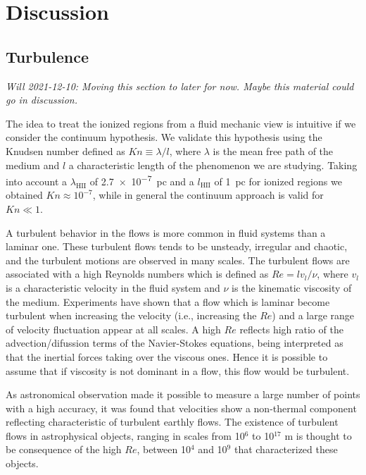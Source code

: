 \documentclass[fleqn,usenatbib, useAMS, a4paper]{mnras}
\begin{document}



\section{Discussion}\label{sec:discussion}

\subsection{Turbulence}\label{sec:turbulence-theory}

\textit{Will 2021-12-10: Moving this section to later for now. Maybe
  this material could go in discussion.}

The idea to treat the ionized regions from a fluid mechanic view is intuitive if we consider the continuum hypothesis. 
We validate this hypothesis using the Knudsen number defined as \(Kn \equiv \lambda / l\), where \(\lambda\) is the mean free path of the medium and \(l\) a characteristic length of the phenomenon we are studying.
Taking into account a \(\lambda_{\text{HII}}\) of \SI{2.7e-7}{pc} \citep{1941ApJ....93..369S} and a \(l_{\text{HII}}\) of \SI{1}{pc} for ionized regions we obtained \(Kn \approx 10^{-7}\), while in general the continuum approach is valid for \(Kn \ll 1\).

A turbulent behavior in the flows is more common in fluid systems than a laminar one.
These turbulent flows tends to be unsteady, irregular and chaotic, and the turbulent motions are observed in many scales. 
The turbulent flows are associated with a high Reynolds numbers which is defined as \(Re = l v_{l} / \nu \), where \(v_{l}\) is a characteristic velocity in the fluid system and \(\nu\) is the kinematic viscosity of the medium.
Experiments have shown that a flow which is laminar become turbulent when increasing the velocity (i.e., increasing the \(Re\)) and a large range of velocity fluctuation appear at all scales.
A high \(Re\) reflects high ratio of the advection/difussion terms of the Navier-Stokes equations, being interpreted as that the inertial forces taking over the viscous ones. 
Hence it is possible to assume that if viscosity is not dominant in a flow, this flow would be turbulent.

As astronomical observation made it possible to measure a large number of points with a high accuracy, it was found that velocities show a non-thermal component reflecting characteristic of turbulent earthly flows.
The existence of turbulent flows in astrophysical objects, ranging in scales from 10\(^6\) to 10\(^{17}\) m \citep{2010ApJ...710..853C} is thought to be consequence of the high \(Re\), between 10\(^4\) and 10\(^9\) \citep{1949ApJ...110..329C,lagrois2011} that characterized these objects.
\end{document}
